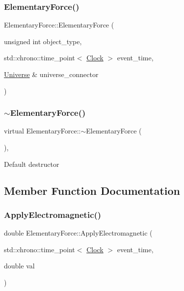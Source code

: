 \subsubsection{\texorpdfstring{Elementary\+Force()}{ElementaryForce()}\hspace{0.1cm}{\footnotesize\ttfamily [4/4]}}
{\footnotesize\ttfamily Elementary\+Force\+::\+Elementary\+Force (\begin{DoxyParamCaption}\item[{unsigned int}]{object\+\_\+type,  }\item[{std\+::chrono\+::time\+\_\+point$<$ \mbox{\hyperlink{universe_8h_a0ef8d951d1ca5ab3cfaf7ab4c7a6fd80}{Clock}} $>$}]{event\+\_\+time,  }\item[{\mbox{\hyperlink{classUniverse}{Universe}} \&}]{universe\+\_\+connector }\end{DoxyParamCaption})\hspace{0.3cm}{\ttfamily [inline]}}

\mbox{\label{classElementaryForce_afee0c87be3bd2a5221c9fcaddd70dfa6}} 
\subsubsection{\texorpdfstring{$\sim$\+Elementary\+Force()}{~ElementaryForce()}}
{\footnotesize\ttfamily virtual Elementary\+Force\+::$\sim$\+Elementary\+Force (\begin{DoxyParamCaption}{ }\end{DoxyParamCaption})\hspace{0.3cm}{\ttfamily [inline]}, {\ttfamily [virtual]}}

Default destructor 

\subsection{Member Function Documentation}
\mbox{\label{classElementaryForce_a0045a3380e468c6cfdbefce829888c1f}} 
\subsubsection{\texorpdfstring{Apply\+Electromagnetic()}{ApplyElectromagnetic()}}
{\footnotesize\ttfamily double Elementary\+Force\+::\+Apply\+Electromagnetic (\begin{DoxyParamCaption}\item[{std\+::chrono\+::time\+\_\+point$<$ \mbox{\hyperlink{universe_8h_a0ef8d951d1ca5ab3cfaf7ab4c7a6fd80}{Clock}} $>$}]{event\+\_\+time,  }\item[{double}]{val }\end{DoxyParamCaption})\hspace{0.3cm}{\ttfamily [virtual]}}



